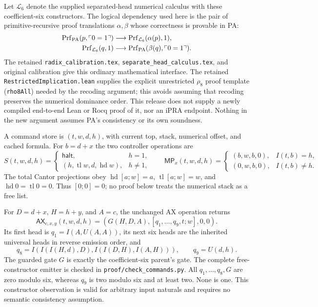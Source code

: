 Let $\mathcal L_6$ denote the supplied separated-head numerical calculus
with these coefficient-six constructors.  The logical dependency used here
is the pair of primitive-recursive proof translations $\alpha,\beta$ whose
correctness is provable in PA:
\begin{align*}
 \operatorname{Prf}_{\rm PA}(p,\ulcorner0=1\urcorner)
     &\longrightarrow \operatorname{Prf}_{\mathcal L_6}(\alpha(p),1),\\
 \operatorname{Prf}_{\mathcal L_6}(q,1)
     &\longrightarrow \operatorname{Prf}_{\rm PA}(\beta(q),\ulcorner0=1\urcorner).
\end{align*}
The retained \texttt{radix\_calibration.tex},
\texttt{separate\_head\_calculus.tex}, and original calibration give this
ordinary mathematical interface.  The retained
\texttt{RestrictedImplication.lean} supplies the explicit unrestricted
$\rho_8$ proof template (\texttt{rho8All}) needed by the recoding argument;
this avoids assuming that recoding preserves the numerical dominance order.
This release does not supply a newly
compiled end-to-end Lean or Rocq proof of it, nor an iPRA endpoint.
Nothing in the new argument assumes PA's consistency or its own soundness.

A command store is $(t,w,d,h)$, with current top, stack, numerical offset,
and cached formula.  For $b=d+x$ the two controller operations are
\[
 S(t,w,d,h)=\begin{cases}
 \mathsf{halt},&h=1,\\
 (h,\operatorname{tl}w,d,\operatorname{hd}w),&h\ne1,
 \end{cases}
 \qquad
 \mathsf{MP}_{x}(t,w,d,h)=\begin{cases}
 (b,w,b,0),&I(t,b)=h,\\
 (0,w,b,0),&I(t,b)\ne h.
 \end{cases}
\]
The total Cantor projections obey
$\operatorname{hd}[a;w]=a$, $\operatorname{tl}[a;w]=w$, and
$\operatorname{hd}0=\operatorname{tl}0=0$.  Thus $[0;0]=0$; no proof below
treats the numerical stack as a free list.

For $D=d+x$, $H=h+y$, and $A=c$, the unchanged AX operation returns
\[
 \mathsf{AX}_{c,x,y}(t,w,d,h)=
 (G(H,D,A),[q_1,\ldots,q_9,t;w],0,0).
\]
Its first head is $q_1=I(A,U(A,A))$, its next six heads are the inherited
universal heads in reverse emission order, and
\[
 q_8=I(I(I(H,d),D),I(I(D,H),I(A,H))),\qquad q_9=U(d,h).
\]
The guarded gate $G$ is exactly the coefficient-six parent's gate.
The complete free-constructor emitter is checked in
\texttt{proof/check\_commands.py}.  All $q_1,\ldots,q_8,G$ are zero modulo
six, whereas $q_9$ is two modulo six and at least two.  None is one.
This constructor observation is valid for arbitrary input naturals and
requires no semantic consistency assumption.

